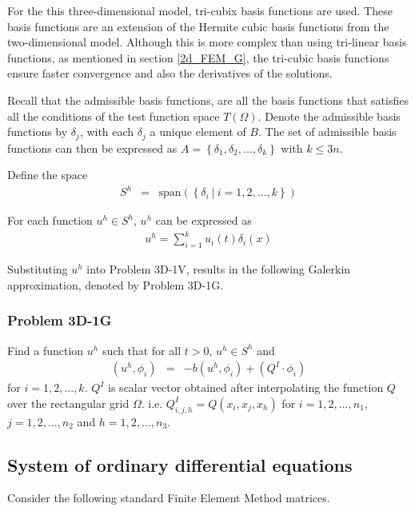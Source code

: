 \documentclass[../../main.tex]{subfiles}
\begin{document}
For the this three-dimensional model, tri-cubix basis functions are used. These basis functions are an extension of the Hermite cubic basis functions from the two-dimensional model. Although this is more complex than using tri-linear basis functions, as mentioned in section \ref{2d_FEM_G}, the tri-cubic basis functions ensure faster convergence and also the derivatives of the solutions.

Recall that the admissible basis functions, are all the basis functions that satisfies all the conditions of the test function space $T(\Omega)$. Denote the admissible basis functions by $\delta_j$, with each $\delta_j$ a unique element of $B$. The set of admissible basis functions can then be expressed as $A = \left\{\delta_1, \delta_2,... , \delta_k\right\}$ with $k \leq 3n$.

Define the space
\begin{eqnarray*}
	S^h & = & \textrm{span}\left(\left\{\delta_i \ | \ i = 1,2,...,k \right\} \right)
\end{eqnarray*}

For each function $u^h \in S^h$, $u^h$ can be expressed as
\begin{eqnarray*}
	u^h = \sum_{i = 1}^{k} u_i(t) \delta_{i}(x)
\end{eqnarray*}

Substituting $u^h$ into Problem 3D-1V, results in the following Galerkin approximation, denoted by Problem 3D-1G.

\subsubsection{Problem 3D-1G}
Find a function $u^h$ such that for all $t>0$, $u^h \in S^h$ and
\begin{eqnarray*}
	(u^h, \phi_i) & = & -b(u^h,\phi_i) + (Q^I \cdot \phi_i)
\end{eqnarray*} for $i = 1,2,...,k$. $Q^I$ is scalar vector obtained after interpolating the function $Q$ over the rectangular grid $\Omega$. i.e. $Q^I_{i,j, h} = Q(x_i,x_j, x_h)$ for $i = 1,2,...,n_1$, $j = 1,2,...,n_2$ and $h = 1,2,...,n_3$.

\subsection{System of ordinary differential equations}
Consider the following standard Finite Element Method matrices.
\end{document}
